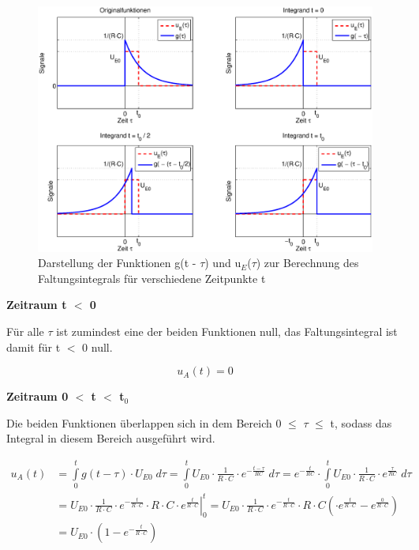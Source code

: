 \begin{figure}[H]
  \centerline{\includegraphics[width=1\textwidth]{Kapitel2/Bilder/image23}}
  \caption{Darstellung der Funktionen g(t - $\tau$) und u${}_{E}$($\tau$) zur Berechnung des Faltungsintegrals f\"{u}r verschiedene Zeitpunkte t}
  \label{fig:FaltungGrafischRCNetzwerk}
\end{figure}\bigskip

{\selectfont
\noindent\textbf{Zeitraum  t $\mathrm{<}$ 0}}\smallskip

\noindent F\"{u}r alle $\tau$ ist zumindest eine der beiden Funktionen null, das Faltungsintegral ist damit f\"{u}r t $\mathrm{<}$ 0 null.

\begin{equation}\label{eq:threehundredseventyseven}
u_{A} \left(t\right)=0
\end{equation}\bigskip

{\selectfont
\noindent\textbf{Zeitraum 0 $\mathrm{<}$ t $\mathrm{<}$ t$_{0}$}}\smallskip

\noindent Die beiden Funktionen \"{u}berlappen sich in dem Bereich 0 $\leq$ $\tau$ $\leq$ t, sodass das Integral in diesem Bereich ausgef\"{u}hrt wird. 

\begin{equation}\label{eq:threehundredseventyeight}
\begin{split}
u_{A} \left(t\right) & = \int\limits _{0}^{t}g\left(t-\tau \right)\cdot U_{E0} \;d\tau  =\int\limits _{0}^{t}U_{E0} \cdot \frac{1}{R\cdot C} \cdot e^{-\frac{t-\tau }{RC} } \;d\tau  =e^{-\frac{t}{RC} } \cdot \int\limits _{0}^{t}U_{E0} \cdot \frac{1}{R\cdot C} \cdot e^{\frac{\tau }{RC} } \;d\tau\\
& =\left. U_{E0}\cdot\frac{1}{R\cdot C}\cdot e^{-\frac{t}{R\cdot C}}\cdot R\cdot C \cdot  e^{\frac{t}{R\cdot C}}\right|_{0}^{t} 
=  U_{E0}\cdot \frac{1}{R\cdot C}\cdot e^{-\frac{t}{R\cdot C}}\cdot R\cdot C (\cdot  e^{\frac{t}{R\cdot C}}-e^{\frac{0}{R\cdot C}})\\
& =  U_{E0} \cdot (1-e^{-\frac{t}{R\cdot C}})
\end{split}
\end{equation}\bigskip
\clearpage

